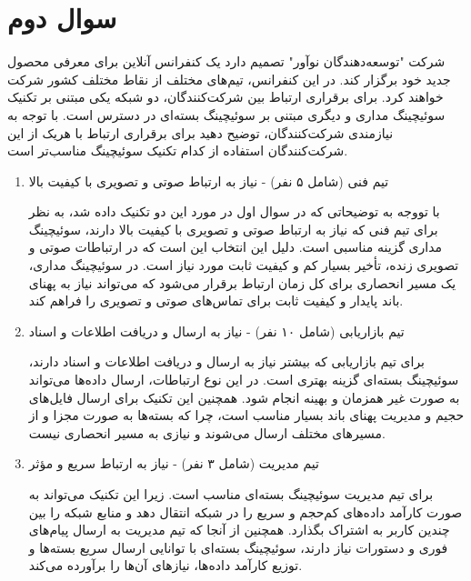\section{سوال دوم}
شرکت "توسعه‌دهندگان نوآور" تصمیم دارد یک کنفرانس آنلاین برای معرفی محصول جدید خود برگزار کند. در این کنفرانس، تیم‌های مختلف از نقاط مختلف کشور شرکت خواهند کرد. برای برقراری ارتباط بین شرکت‌کنندگان، دو شبکه یکی مبتنی بر تکنیک سوئیچینگ مداری و دیگری مبتنی بر سوئیچینگ بسته‌ای در دسترس است. با توجه به نیازمندی شرکت‌کنندگان، توضیح دهید برای برقراری ارتباط با هریک از این شرکت‌کنندگان استفاده از کدام تکنیک سوئیچینگ مناسب‌تر است.

\begin{enumerate}
	\item 
	تیم فنی (شامل ۵ نفر) - نیاز به ارتباط صوتی و تصویری با کیفیت بالا
	\begin{qsolve}
		با تووجه به توضیحاتی که در سوال اول در مورد این دو تکنیک داده شد، به نظر برای تیم فنی که نیاز به ارتباط صوتی و تصویری با کیفیت بالا دارند، سوئیچینگ مداری گزینه مناسبی است. دلیل این انتخاب این است که در ارتباطات صوتی و تصویری زنده، تأخیر بسیار کم و کیفیت ثابت مورد نیاز است. در سوئیچینگ مداری، یک مسیر انحصاری برای کل زمان ارتباط برقرار می‌شود که می‌تواند نیاز به پهنای باند پایدار و کیفیت ثابت برای تماس‌های صوتی و تصویری را فراهم کند.
	\end{qsolve}
	
	\item 
	تیم بازاریابی (شامل ۱۰ نفر) - نیاز به ارسال و دریافت اطلاعات و اسناد
	\begin{qsolve}
		برای تیم بازاریابی که بیشتر نیاز به ارسال و دریافت اطلاعات و اسناد دارند، سوئیچینگ بسته‌ای گزینه بهتری است. در این نوع ارتباطات، ارسال داده‌ها می‌تواند به صورت غیر همزمان و بهینه انجام شود. همچنین این تکنیک برای ارسال فایل‌های حجیم و مدیریت پهنای باند بسیار مناسب است، چرا که بسته‌ها به صورت مجزا و از مسیرهای مختلف ارسال می‌شوند و نیازی به مسیر انحصاری نیست.
	\end{qsolve}
	
	\item 
	تیم مدیریت (شامل ۳ نفر) - نیاز به ارتباط سریع و مؤثر
	\begin{qsolve}
		برای تیم مدیریت سوئیچینگ بسته‌ای مناسب است. زیرا این تکنیک می‌تواند به صورت کارآمد داده‌های کم‌حجم و سریع را در شبکه انتقال دهد و منابع شبکه را بین چندین کاربر به اشتراک بگذارد. همچنین از آنجا که تیم مدیریت به ارسال پیام‌های فوری و دستورات نیاز دارند، سوئیچینگ بسته‌ای با توانایی ارسال سریع بسته‌ها و توزیع کارآمد داده‌ها، نیازهای آن‌ها را برآورده می‌کند.
	\end{qsolve}
\end{enumerate}
